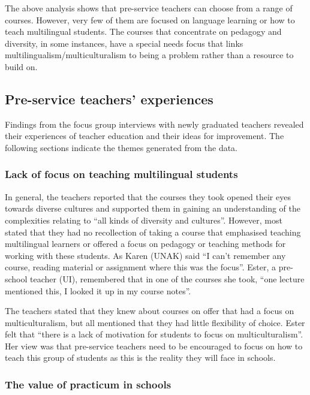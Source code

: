 \documentclass[output=paper]{langscibook}
\begin{document}
The above analysis shows that pre-service teachers can choose from a range of courses. However, very few of them are focused on language learning or how to teach multilingual students. The courses that concentrate on pedagogy and diversity, in some instances, have a special needs focus that links multilingualism\slash multiculturalism to being a problem rather than a resource to build on. 

\subsection{Pre-service teachers’ experiences}
\label{sec:gunnþórsdóttir:5.2}%

Findings from the focus group interviews with newly graduated teachers revealed their experiences of teacher education and their ideas for improvement. The following sections indicate the themes generated from the data.  

\subsubsection{Lack of focus on teaching multilingual students}  %

In general, the teachers reported that the courses they took opened their eyes towards diverse cultures and supported them in gaining an understanding of the complexities relating to “all kinds of diversity and cultures”. However, most stated that they had no recollection of taking a course that emphasised teaching multilingual learners or offered a focus on pedagogy or teaching methods for working with these students. As Karen (UNAK) said “I can’t remember any course, reading material or assignment where this was the focus”. Ester, a pre-school teacher (UI), remembered that in one of the courses she took, “one lecture mentioned this, I looked it up in my course notes”.

The teachers stated that they knew about courses on offer that had a focus on multiculturalism, but all mentioned that they had little flexibility of choice. Ester felt that “there is a lack of motivation for students to focus on multiculturalism”. Her view was that pre-service teachers need to be encouraged to focus on how to teach this group of students as this is the reality they will face in schools. 

\subsubsection{The value of practicum in schools} %
\end{document}
